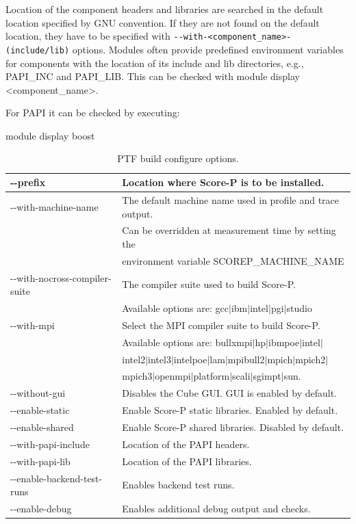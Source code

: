 \documentclass[11pt,a4paper, oneside]{book} %
\newcommand{\ptfbrackets}[1]{\textless #1\textgreater}
\begin{document}
Location of the component headers and libraries are searched in the default
location specified by GNU convention. If they are not found on the default
location, they have to be specified with
\texttt{-{}-with-\ptfbrackets{component\_name}-(include/lib)} options.
Modules often provide predefined environment variables for components with the
location of its include and lib directories, e.g., PAPI\_INC and PAPI\_LIB. This
can be checked with module display \ptfbrackets{component\_name}.

For PAPI it can be checked by executing:

module display boost
\begin{table}[h]
\begin{center}
  \begin{tabular}{ | l | l | }
    \hline
    -{}-prefix                      & Location where Score-P is to be installed.\\ \hline
    -{}-with-machine-name           & The default machine name used in profile and trace output.\\ 
                                    & Can be overridden at measurement time by setting the\\
                                    & environment variable SCOREP\_MACHINE\_NAME\\ \hline
    -{}-with-nocross-compiler-suite & The compiler suite used to build Score-P.\\
                                    & Available options are: gcc$|$ibm$|$intel$|$pgi$|$studio\\ \hline
    -{}-with-mpi                    & Select the MPI compiler suite to build Score-P.\\
                                    & Available options are: bullxmpi$|$hp$|$ibmpoe$|$intel$|$\\
                                    & intel2$|$intel3$|$intelpoe$|$lam$|$mpibull2$|$mpich$|$mpich2$|$\\
                                    & mpich3$|$openmpi$|$platform$|$scali$|$sgimpt$|$sun.\\ \hline
    -{}-without-gui                 & Disables the Cube GUI. GUI is enabled by default.\\ \hline
    -{}-enable-static               & Enable Score-P static libraries. Enabled by default.\\ \hline
    -{}-enable-shared               & Enable Score-P shared libraries. Disabled by default.\\ \hline
    -{}-with-papi-include           & Location of the PAPI headers.\\ \hline
    -{}-with-papi-lib               & Location of the PAPI libraries.\\ \hline
    -{}-enable-backend-test-runs    & Enables backend test runs.\\ \hline
    -{}-enable-debug                & Enables additional debug output and checks.\\ \hline
  \end{tabular}
\end{center}
\caption{PTF build configure options.}\label{tab:ScorePbuildconfig}
\end{table}
\end{document}
